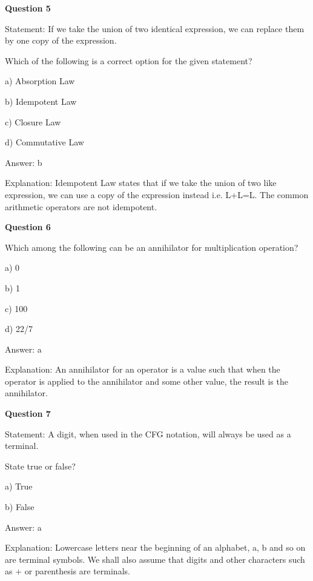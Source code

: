 \documentclass{article}
\begin{document}
\begin{mdframed}[linewidth=1pt, roundcorner=5pt, linecolor=gray!30, backgroundcolor=gray!5]
\textbf{Question 5} 

Statement: If we take the union of two identical expression, we can replace them by one copy of the expression.

Which of the following is a correct option for the given statement?

a) Absorption Law

b) Idempotent Law

c) Closure Law

d) Commutative Law
\vspace{5pt} \par
\begin{tcolorbox}[colback=green!5, colframe=green!40!black, title=Solution]
Answer: b

Explanation: Idempotent Law states that if we take the union of two like expression, we can use a copy of the expression instead i.e. L+L=L. The common arithmetic operators are not idempotent.
\end{tcolorbox}
\end{mdframed}

\begin{mdframed}[linewidth=1pt, roundcorner=5pt, linecolor=gray!30, backgroundcolor=gray!5]
\textbf{Question 6} 

Which among the following can be an annihilator for multiplication operation?

a) 0

b) 1

c) 100

d) 22/7
\vspace{5pt} \par
\begin{tcolorbox}[colback=green!5, colframe=green!40!black, title=Solution]
Answer: a

Explanation: An annihilator for an operator is a value such that when the operator is applied to the annihilator and some other value, the result is the annihilator.
\end{tcolorbox}
\end{mdframed}
\newpage

\begin{mdframed}[linewidth=1pt, roundcorner=5pt, linecolor=gray!30, backgroundcolor=gray!5]
\textbf{Question 7} 

Statement: A digit, when used in the CFG notation, will always be used as a terminal.

State true or false?

a) True

b) False
\vspace{5pt} \par
\begin{tcolorbox}[colback=green!5, colframe=green!40!black, title=Solution]
Answer: a

Explanation: Lowercase letters near the beginning of an alphabet, a, b and so on are terminal symbols. We shall also assume that digits and other characters such as + or parenthesis are terminals.
\end{tcolorbox}
\end{mdframed}
\end{document}

